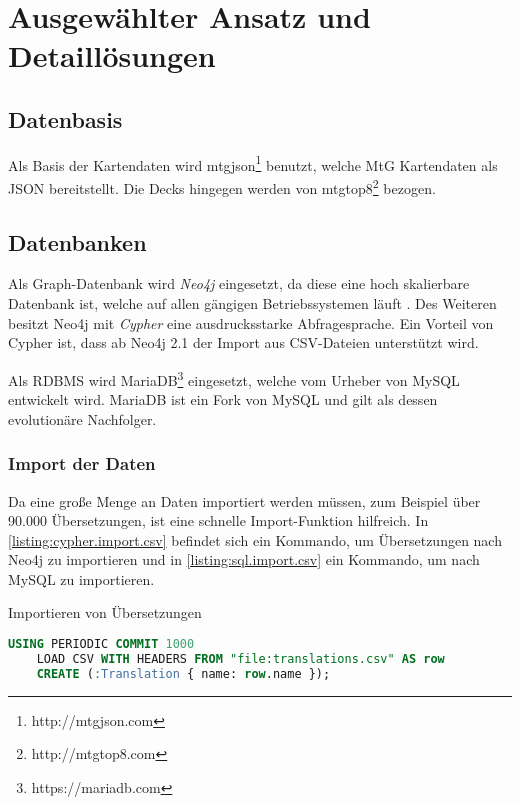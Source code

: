 \section{Ausgewählter Ansatz und Detaillösungen}\label{ch:ansatz}

\subsection{Datenbasis}
Als Basis der Kartendaten wird mtgjson\footnote{http://mtgjson.com} benutzt, welche \ac{MtG} Kartendaten als \ac{JSON} bereitstellt. Die Decks hingegen werden von mtgtop8\footnote{http://mtgtop8.com} bezogen.

\subsection{Datenbanken}
Als Graph-Datenbank wird \emph{Neo4j} eingesetzt, da diese eine hoch skalierbare Datenbank ist, welche auf allen gängigen Betriebssystemen läuft \cite{goel2015neo4j}. Des Weiteren besitzt Neo4j mit \emph{Cypher} eine ausdrucksstarke Abfragesprache. Ein Vorteil von Cypher ist, dass ab Neo4j 2.1 der Import aus \ac{CSV}-Dateien unterstützt wird. \cite{panzarino2014cypher}

Als \ac{RDBMS} wird MariaDB\footnote{https://mariadb.com} eingesetzt, welche vom Urheber von MySQL entwickelt wird. MariaDB ist ein Fork von MySQL und gilt als dessen evolutionäre Nachfolger. \cite{bartholomew2013getting}

\subsubsection{Import der Daten}
Da eine große Menge an Daten importiert werden müssen, zum Beispiel über 90.000 Übersetzungen, ist eine schnelle Import-Funktion hilfreich. In \autoref{listing:cypher.import.csv} befindet sich ein Kommando, um Übersetzungen nach Neo4j zu importieren und in \autoref{listing:sql.import.csv} ein Kommando, um nach MySQL zu importieren.

\begin{listing}[H]
    \caption{Importieren von Übersetzungen}
    \label{listing:cypher.import.csv}
    \begin{lstlisting}[language=SQL]
    USING PERIODIC COMMIT 1000
    LOAD CSV WITH HEADERS FROM "file:translations.csv" AS row
    CREATE (:Translation { name: row.name });
    \end{lstlisting}
\end{listing}

